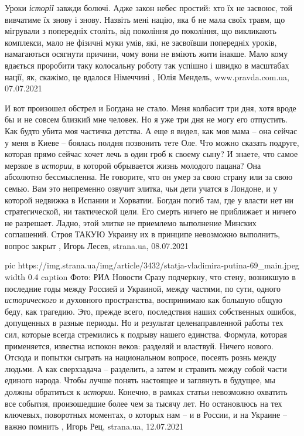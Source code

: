Уроки \emph{історії} завжди болючі. Адже закон небес простий: хто їх не засвоює, той
вивчатиме їх знову і знову.  Назвіть мені націю, яка б не мала своїх травм, що
мігрували з попередніх століть, від покоління до покоління, що викликають
комплекси, мало не фізичні муки умів, які, не засвоївши попередніх уроків,
намагаються осягнути причини, чому вони не вміють жити інакше.  Мало кому
вдається проробити таку колосальну роботу так успішно і швидко в масштабах
нації, як, скажімо, це вдалося Німеччині
, 
Юлія Мендель, www.pravda.com.ua, 07.07.2021

И вот произошел обстрел и Богдана не стало. Меня колбасит три дня, хотя вроде
бы и не совсем близкий мне человек. Но я уже три дня не могу его отпустить. Как
будто убита моя частичка детства. А еще я видел, как моя мама – она сейчас у
меня в Киеве – боялась полдня позвонить тете Оле. Что можно сказать подруге,
которая прямо сейчас хочет лечь в один гроб к своему сыну?
И знаете, что самое мерзкое в \emph{истории}, в которой обрывается жизнь молодого
пацана? Она абсолютно бессмысленна. Не говорите, что он умер за свою страну или
за свою семью. Вам это непременно озвучит элитка, чьи дети учатся в Лондоне, и
у которой недвижка в Испании и Хорватии. Богдан погиб там, где у власти нет ни
стратегической, ни тактической цели. Его смерть ничего не приближает и ничего
не разрешает.  Ладно, этой элитке не приемлемо выполнение Минских соглашений.
Строя ТАКУЮ Украину их в принципе невозможно выполнить, вопрос закрыт
, 
Игорь Лесев, strana.ua, 08.07.2021

\ifcmt
  pic https://img.strana.ua/img/article/3432/statja-vladimira-putina-69_main.jpeg
  width 0.4
	caption Фото: РИА Новости 
\fi
Сразу подчеркну, что стену, возникшую в последние годы между Россией и
Украиной, между частями, по сути, одного \emph{исторического} и духовного
пространства, воспринимаю как большую общую беду, как трагедию. Это, прежде
всего, последствия наших собственных ошибок, допущенных в разные периоды. Но и
результат целенаправленной работы тех сил, которые всегда стремились к подрыву
нашего единства. Формула, которая применяется, известна испокон веков: разделяй
и властвуй. Ничего нового. Отсюда и попытки сыграть на национальном вопросе,
посеять рознь между людьми. А как сверхзадача – разделить, а затем и стравить
между собой части единого народа.  Чтобы лучше понять настоящее и заглянуть в
будущее, мы должны обратиться к \emph{истории}. Конечно, в рамках статьи
невозможно охватить все события, произошедшие более чем за тысячу лет. Но
остановлюсь на тех ключевых, поворотных моментах, о которых нам – и в России, и
на Украине – важно помнить
, 
Игорь Рец, strana.ua, 12.07.2021

